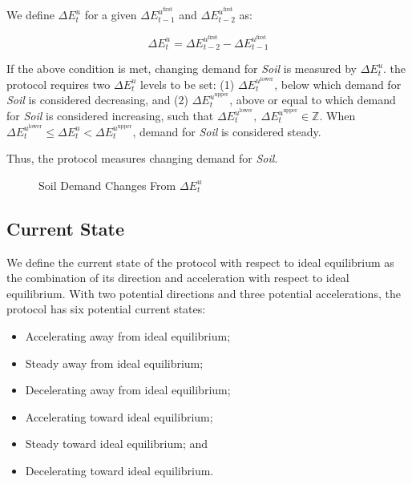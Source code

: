 \documentclass[tikz]{article}
\newcommand{\term}[1]{\textsl{#1}}
\begin{document}
We define $\Delta E_{t}^{u}$ for a given $\Delta E_{t-1}^{u^{\text{first}}}$ and $\Delta E_{t-2}^{u^{\text{first}}}$ as:

    $$
        \Delta E_{t}^{u} = 
            \Delta E_{t-2}^{u^{\text{first}}} - \Delta E_{t-1}^{u^{\text{first}}}
    $$

If the above condition is met, changing demand for \term{Soil} is measured by $\Delta E_{t}^{u}$. the protocol requires two $\Delta E_{t}^{u}$ levels to be set: (1) $\Delta E_{t}^{u^{\text{lower}}}$, below which demand for \term{Soil} is considered decreasing, and (2) $\Delta E_{t}^{u^{\text{upper}}}$, above or equal to which demand for \term{Soil} is considered increasing, such that $\Delta E_{t}^{u^{\text{lower}}},\ \Delta E_{t}^{u^{\text{upper}}} \in \mathbb{Z}$. When $\Delta E_{t}^{u^{\text{lower}}} \leq \Delta E_{t}^{u} < \Delta E_{t}^{u^{\text{upper}}}$, demand for \term{Soil} is considered steady.

Thus, the protocol measures changing demand for \term{Soil}.


\begin{figure}[h!]
    \centering
    
    \vspace*{-10.5mm} %
    \setlength{\belowcaptionskip}{-8pt} %
    \caption{Soil Demand Changes From $\Delta E_{t}^{u}$}
    \label{Soil Demand Changes From Time}
\end{figure}


\subsection{Current State}

We define the current state of the protocol with respect to ideal equilibrium as the combination of its direction and acceleration with respect to ideal equilibrium. With two potential directions and three potential accelerations, the protocol has six potential current states:

\begin{multicols}{2}
\begin{itemize}[midsep]
    \item Accelerating away from ideal equilibrium;
    \item Steady away from ideal equilibrium;
    \item Decelerating away from ideal equilibrium;
    \item Accelerating toward ideal equilibrium;
    \item Steady toward ideal equilibrium; and
    \item Decelerating toward ideal equilibrium.
\end{itemize}
\end{multicols}
\end{document}
